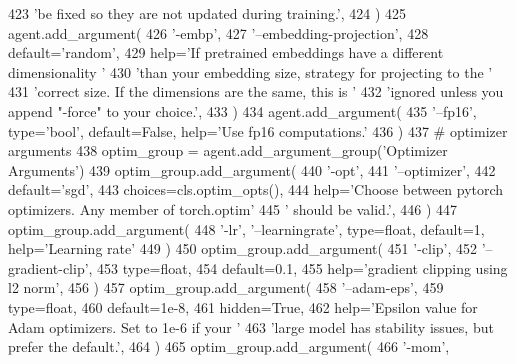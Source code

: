\begin{DoxyCode}
423             \textcolor{stringliteral}{'be fixed so they are not updated during training.'},
424         )
425         agent.add\_argument(
426             \textcolor{stringliteral}{'-embp'},
427             \textcolor{stringliteral}{'--embedding-projection'},
428             default=\textcolor{stringliteral}{'random'},
429             help=\textcolor{stringliteral}{'If pretrained embeddings have a different dimensionality '}
430             \textcolor{stringliteral}{'than your embedding size, strategy for projecting to the '}
431             \textcolor{stringliteral}{'correct size. If the dimensions are the same, this is '}
432             \textcolor{stringliteral}{'ignored unless you append "-force" to your choice.'},
433         )
434         agent.add\_argument(
435             \textcolor{stringliteral}{'--fp16'}, type=\textcolor{stringliteral}{'bool'}, default=\textcolor{keyword}{False}, help=\textcolor{stringliteral}{'Use fp16 computations.'}
436         )
437         \textcolor{comment}{# optimizer arguments}
438         optim\_group = agent.add\_argument\_group(\textcolor{stringliteral}{'Optimizer Arguments'})
439         optim\_group.add\_argument(
440             \textcolor{stringliteral}{'-opt'},
441             \textcolor{stringliteral}{'--optimizer'},
442             default=\textcolor{stringliteral}{'sgd'},
443             choices=cls.optim\_opts(),
444             help=\textcolor{stringliteral}{'Choose between pytorch optimizers. Any member of torch.optim'}
445             \textcolor{stringliteral}{' should be valid.'},
446         )
447         optim\_group.add\_argument(
448             \textcolor{stringliteral}{'-lr'}, \textcolor{stringliteral}{'--learningrate'}, type=float, default=1, help=\textcolor{stringliteral}{'Learning rate'}
449         )
450         optim\_group.add\_argument(
451             \textcolor{stringliteral}{'-clip'},
452             \textcolor{stringliteral}{'--gradient-clip'},
453             type=float,
454             default=0.1,
455             help=\textcolor{stringliteral}{'gradient clipping using l2 norm'},
456         )
457         optim\_group.add\_argument(
458             \textcolor{stringliteral}{'--adam-eps'},
459             type=float,
460             default=1e-8,
461             hidden=\textcolor{keyword}{True},
462             help=\textcolor{stringliteral}{'Epsilon value for Adam optimizers. Set to 1e-6 if your '}
463             \textcolor{stringliteral}{'large model has stability issues, but prefer the default.'},
464         )
465         optim\_group.add\_argument(
466             \textcolor{stringliteral}{'-mom'},

\end{DoxyCode}
